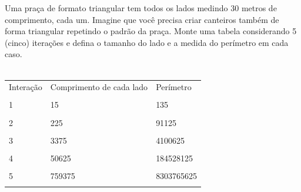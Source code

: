 \documentclass[a4paper, 12pt]{article}
\begin{document}
\begin{enumerate}
\begin{enumerate}
\begin{itemize}
        Uma praça de formato triangular tem todos os lados medindo 30 metros de comprimento, cada um. Imagine que você precisa criar canteiros também de forma triangular repetindo o padrão da praça. Monte uma tabela considerando 5 (cinco) iterações e defina o tamanho do lado e a medida do perímetro em cada caso. \\ \\
      \begin{tabular}{|m{3cm} | m{5cm} | m{4cm}|}
      \hline
      Interação & Comprimento de cada lado & Perímetro \\ \\
      \hline
      1 & 15 & 135 \\ \\
      \hline
      2 & 225 & 91125 \\ \\
      \hline
      3 & 3375 & 4100625 \\ \\
      \hline
      4 & 50625 & 184528125 \\ \\
      \hline
      5 & 759375 & 8303765625  \\ \\
      \hline
      \end{tabular}
      \end{itemize}      
      \end{enumerate}
\end{enumerate}
\end{document}
